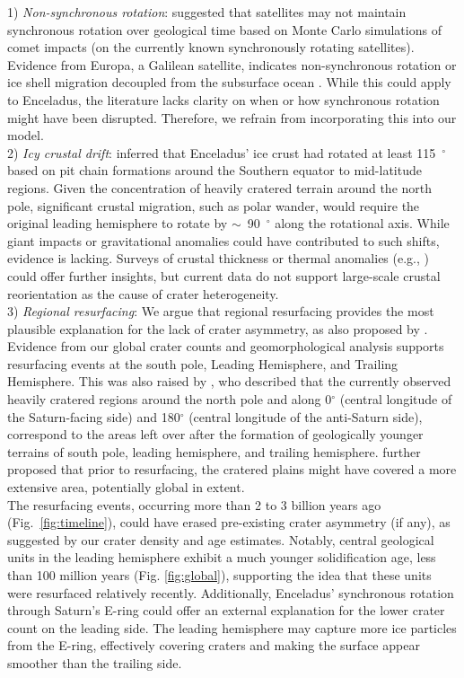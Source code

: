\documentclass[preprint,12pt,3p,times,authoryear]{elsarticle}
\begin{document}
1) \textit{Non-synchronous rotation}: \citet{Zahnle2001} suggested that satellites may not maintain synchronous rotation over geological time based on Monte Carlo simulations of comet impacts (on the currently known synchronously rotating satellites). Evidence from Europa, a Galilean satellite, indicates non-synchronous rotation or ice shell migration decoupled from the subsurface ocean \citep{Kattenhorn2009,Collins2009}. While this could apply to Enceladus, the literature lacks clarity on when or how synchronous rotation might have been disrupted. Therefore, we refrain from incorporating this into our model.\\

2) \textit{Icy crustal drift}: \citet{Martin2014} inferred that Enceladus' ice crust had rotated at least 115~$^\circ$ based on pit chain formations around the Southern equator to mid-latitude regions. Given the concentration of heavily cratered terrain around the north pole, significant crustal migration, such as polar wander, would require the original leading hemisphere to rotate by $\sim$~90~$^\circ$ along the rotational axis. While giant impacts or gravitational anomalies could have contributed to such shifts, evidence is lacking. Surveys of crustal thickness or thermal anomalies (e.g., \citealt{Schenk2024}) could offer further insights, but current data do not support large-scale crustal reorientation as the cause of crater heterogeneity.\\

3) \textit{Regional resurfacing}: We argue that regional resurfacing provides the most plausible explanation for the lack of crater asymmetry, as also proposed by \citet{Zahnle2001}.
Evidence from our global crater counts and geomorphological analysis supports resurfacing events at the south pole, Leading Hemisphere, and Trailing Hemisphere. This was also raised by \citet{Patterson2018}, who described that the currently observed heavily cratered regions around the north pole and along 0$^\circ$ (central longitude of the Saturn-facing side) and 180$^\circ$ (central longitude of the anti-Saturn side), correspond to the areas left over after the formation of geologically younger terrains of south pole, leading hemisphere, and trailing hemisphere. \citet{Patterson2018} further proposed that prior to resurfacing, the cratered plains might have covered a more extensive area, potentially global in extent.\\

The resurfacing events, occurring more than 2 to 3 billion years ago (Fig.~\ref{fig:timeline}), could have erased pre-existing crater asymmetry (if any), as suggested by our crater density and age estimates. Notably, central geological units in the leading hemisphere exhibit a much younger solidification age, less than 100 million years (Fig. \ref{fig:global}), supporting the idea that these units were resurfaced relatively recently.
Additionally, Enceladus' synchronous rotation through Saturn's E-ring could offer an external explanation for the lower crater count on the leading side. The leading hemisphere may capture more ice particles from the E-ring, effectively covering craters and making the surface appear smoother than the trailing side.\\
\end{document}
